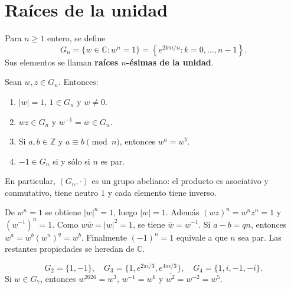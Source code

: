 \section{Raíces de la unidad}
\begin{definicion}
Para $n\geq1$ entero, se define
\[
G_n=\{w\in\mathbb C:w^n=1\}
=\left\{e^{2k\pi i/n}:k=0,\ldots,n-1\right\}.
\]
Sus elementos se llaman \textbf{raíces $n$-ésimas de la unidad}.
\end{definicion}
\begin{proposicion}[{title={Propiedades de $G_n$}}]
Sean $w,z\in G_n$. Entonces:
\begin{enumerate}
\item $|w|=1$, $1\in G_n$ y $w\neq0$.
\item $wz\in G_n$ y $w^{-1}=\overline w\in G_n$.
\item Si $a,b\in\mathbb Z$ y $a\equiv b\pmod n$, entonces $w^a=w^b$.
\item $-1\in G_n$ si y sólo si $n$ es par.
\end{enumerate}
En particular, $(G_n,\cdot)$ es un grupo abeliano: el producto es
asociativo y conmutativo, tiene neutro $1$ y cada elemento tiene inverso.
\end{proposicion}
\begin{demostracion}
De $w^n=1$ se obtiene $|w|^n=1$, luego $|w|=1$.
Además $(wz)^n=w^nz^n=1$ y $(w^{-1})^n=1$.
Como $w\overline w=|w|^2=1$, se tiene $\overline w=w^{-1}$.
Si $a-b=qn$, entonces $w^a=w^b(w^n)^q=w^b$.
Finalmente $(-1)^n=1$ equivale a que $n$ sea par.
Las restantes propiedades se heredan de $\mathbb C$.
\end{demostracion}
\begin{ejemplo}
\[
G_2=\{1,-1\},\quad G_3=\{1,e^{2\pi i/3},e^{4\pi i/3}\},
\quad G_4=\{1,i,-1,-i\}.
\]
Si $w\in G_7$, entonces $w^{2026}=w^3$, $w^{-1}=w^6$ y
$\overline{w^2}=w^{-2}=w^5$.
\end{ejemplo}
